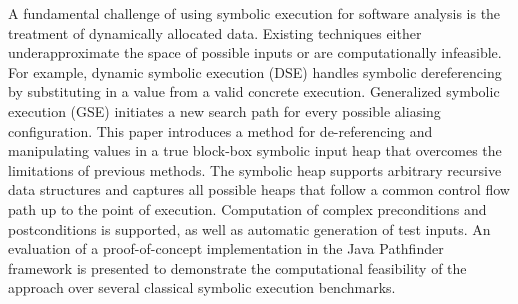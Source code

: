 
A fundamental challenge of using symbolic execution for software analysis is the treatment of dynamically allocated data. Existing techniques either underapproximate the space of possible inputs or are computationally infeasible. For example, dynamic symbolic execution (DSE) handles symbolic dereferencing by substituting in a value from a valid concrete execution. Generalized symbolic execution (GSE) initiates a new search path for every possible aliasing configuration. This paper introduces a method for de-referencing and manipulating values in a true block-box symbolic input heap that overcomes the limitations of previous methods. The symbolic heap supports arbitrary recursive data structures and captures all possible heaps that follow a common control flow path up to the point of execution. Computation of complex preconditions and postconditions is supported, as well as automatic generation of test inputs. An evaluation of a proof-of-concept implementation in the Java Pathfinder framework is presented to demonstrate the computational feasibility of the approach over several classical symbolic execution benchmarks.


